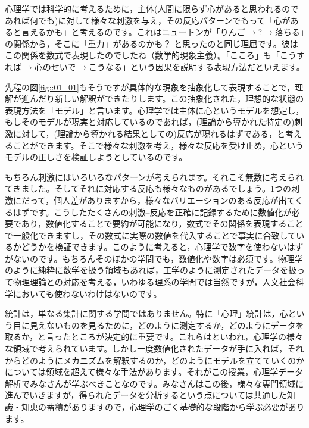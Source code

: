 \documentclass{ltjsbook}
\begin{document}
心理学では科学的に考えるために，主体(人間に限らず心があると思われるのであれば何でも)に対して様々な刺激を与え，その反応パターンでもって「心があると言えるかも」と考えるのです。これはニュートンが「りんご$\to$?$\to$落ちる」の関係から，そこに「重力」があるのかも？ と思ったのと同じ理屈です。彼はこの関係を数式で表現したのでしたね（数学的現象主義）。「こころ」も「こうすれば$\to$心のせいで$\to$こうなる」という因果を説明する表現方法だといえます。

先程の図\ref{fig::01_01}もそうですが具体的な現象を抽象化して表現することで，理解が進んだり新しい解釈ができたりします。この抽象化された，理想的な状態の表現方法を「モデル」と言います。心理学では主体に心というモデルを想定し，もしそのモデルが現実と対応しているのであれば，(理論から導かれた特定の)刺激に対して，(理論から導かれる結果としての)反応が現れるはずである，と考えることができます。そこで様々な刺激を考え，様々な反応を受け止め，心というモデルの正しさを検証しようとしているのです。

もちろん刺激にはいろいろなパターンが考えられます。それこそ無数に考えられてきました。そしてそれに対応する反応も様々なものがあるでしょう。1つの刺激にだって，個人差がありますから，様々なバリエーションのある反応が出てくるはずです。こうしたたくさんの刺激--反応を正確に記録するために数値化が必要であり，数値化することで要約が可能になり，数式でその関係を表現することで一般化できますし，その数式に実際の数値を代入することで事実に合致しているかどうかを検証できます。このように考えると，心理学で数字を使わないはずがないのです。もちろんそのほかの学問でも，数値化や数字は必須です。物理学のように純粋に数学を扱う領域もあれば，工学のように測定されたデータを扱って物理理論との対応を考える，いわゆる理系の学問では当然ですが，人文社会科学においても使わないわけはないのです。

統計は，単なる集計に関する学問ではありません。特に「心理」統計は，心という目に見えないものを見るために，どのように測定するか，どのようにデータを取るか，と言ったところが決定的に重要です。これらはといわれ，心理学の様々な領域で考えられています。しかし一度数値化されたデータが手に入れば，それからどのようにメカニズムを解釈するのか，どのようにモデルを立てていくのかについては領域を超えて様々な手法があります。それがこの授業，心理学データ解析でみなさんが学ぶべきことなのです。みなさんはこの後，様々な専門領域に進んでいきますが，得られたデータを分析するという点については共通した知識・知恵の蓄積がありますので，心理学のごく基礎的な段階から学ぶ必要があります。
\end{document}
